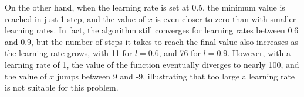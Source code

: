 \documentclass[12pt]{article}
\begin{document}
On the other hand, when the learning rate is set at 0.5, the minimum value is reached in just 1 step, and the value of \( x \) is even closer to zero than with smaller learning rates. In fact, the algorithm still converges for learning rates between 0.6 and 0.9, but the number of steps it takes to reach the final value also increases as the learning rate grows, with 11 for \( l = 0.6 \), and 76 for \( l = 0.9 \). However, with a learning rate of 1, the value of the function eventually diverges to nearly 100, and the value of \(x\) jumps between 9 and -9, illustrating that too large a learning rate is not suitable for this problem.
\end{document}

